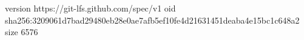 version https://git-lfs.github.com/spec/v1
oid sha256:3209061d7bad29480eb28e0ae7afb5ef10fe4d21631451deaba4e15bc1c648a2
size 6576
